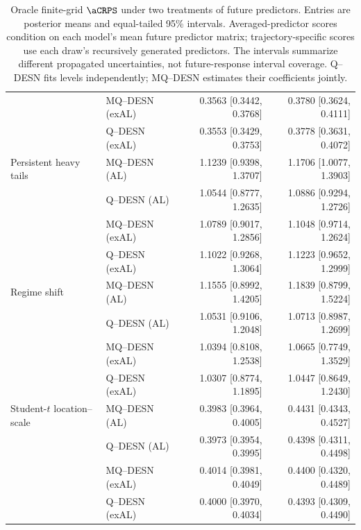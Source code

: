 \begin{table}[p]
\begin{tabular}{@{}>{\raggedright\arraybackslash}p{}lrr@{}}
 & MQ--DESN (exAL) & 0.3563 [0.3442, 0.3768] & 0.3780 [0.3624, 0.4111] \\
 & Q--DESN (exAL) & 0.3553 [0.3429, 0.3753] & 0.3778 [0.3631, 0.4072] \\
\addlinespace[2pt]
Persistent heavy tails & MQ--DESN (AL) & 1.1239 [0.9398, 1.3707] & 1.1706 [1.0077, 1.3903] \\
 & Q--DESN (AL) & 1.0544 [0.8777, 1.2635] & 1.0886 [0.9294, 1.2726] \\
 & MQ--DESN (exAL) & 1.0789 [0.9017, 1.2856] & 1.1048 [0.9714, 1.2624] \\
 & Q--DESN (exAL) & 1.1022 [0.9268, 1.3064] & 1.1223 [0.9652, 1.2999] \\
\addlinespace[2pt]
Regime shift & MQ--DESN (AL) & 1.1555 [0.8992, 1.4205] & 1.1839 [0.8799, 1.5224] \\
 & Q--DESN (AL) & 1.0531 [0.9106, 1.2048] & 1.0713 [0.8987, 1.2699] \\
 & MQ--DESN (exAL) & 1.0394 [0.8108, 1.2538] & 1.0665 [0.7749, 1.3529] \\
 & Q--DESN (exAL) & 1.0307 [0.8774, 1.1895] & 1.0447 [0.8649, 1.2430] \\
\addlinespace[2pt]
Student-\(t\) location--scale & MQ--DESN (AL) & 0.3983 [0.3964, 0.4005] & 0.4431 [0.4343, 0.4527] \\
 & Q--DESN (AL) & 0.3973 [0.3954, 0.3995] & 0.4398 [0.4311, 0.4498] \\
 & MQ--DESN (exAL) & 0.4014 [0.3981, 0.4049] & 0.4400 [0.4320, 0.4489] \\
 & Q--DESN (exAL) & 0.4000 [0.3970, 0.4034] & 0.4393 [0.4309, 0.4490] \\
\bottomrule
\end{tabular}
\caption{Oracle finite-grid \(\aCRPS\) under two treatments of future predictors. Entries are posterior means and equal-tailed 95\% intervals. Averaged-predictor scores condition on each model's mean future predictor matrix; trajectory-specific scores use each draw's recursively generated predictors. The intervals summarize different propagated uncertainties, not future-response interval coverage. Q--DESN fits levels independently; MQ--DESN estimates their coefficients jointly.}
\label{tab:joint-qdesn-pure-desn-v2-recursive-policy}
\label{tab:joint-qdesn-pure-desn-v2-score}
\end{table}
